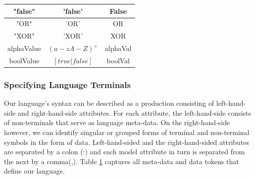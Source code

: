 \documentclass[conference]{IEEEtran}
\begin{document}
\begin{table}[H]
\begin{center}
\begin{tabular}{|c|c|c|}
                              "false" & 'false' & False\\ \hline
                              "OR" & 'OR' & OR\\ \hline
                              "XOR" & 'XOR' & XOR\\ \hline
                              alphaValue & $(a-zA-Z)^+$ & alphaVal\\ \hline
                              boolValue & $[true | false]$ & boolVal\\ \hline
\end{tabular}
\label{tab:langlex}
\end{center}
\end{table}

\subsubsection{Specifying Language Terminals}
Our language's syntax can be described as a production consisting of left-hand-side and right-hand-side attributes. For each attribute, the left-hand-side consists of non-terminals that serve as language meta-data. On the right-hand-side however, we can identify singular or grouped forms of terminal and non-terminal symbols in the form of data. Left-hand-sided and the right-hand-sided attributes are separated by a colon (:) and each model attribute in turn is separated from the next by a comma(,). Table \ref{tab:langlex} captures all meta-data and data tokens that define our language.
\end{document}
